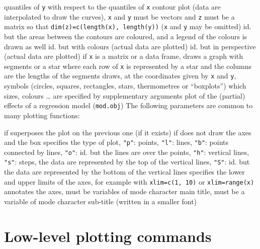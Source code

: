 	{quantiles of {\tt y} with respect to the quantiles of {\tt x}}
	{contour plot (data are interpolated to draw the curves), {\tt x} and {\tt y} must be vectors and {\tt z} must be a matrix so that {\tt dim(z)=c(length(x), length(y))} ({\tt x} and {\tt y} may be omitted)}
	{ id. but the areas between the contours are coloured, and a legend of the colours is drawn as well}
	{ id. but with colours (actual data are plotted)}
	{ id. but in perspective (actual data are plotted)}
	{if {\tt x} is a matrix or a data frame, draws a graph with segments or a star where each row of {\tt x} is represented by a star and the columns are the lengths of the segments}
	{draws, at the coordinates given by {\tt x} and {\tt y}, symbols (circles, squares, rectangles, stars, thermometres or ``boxplots'') which sizes, colours \ldots{} are specified by supplementary arguments}
	{ plot of the (partial) effects of a regression model ({\tt mod.obj})}
The following parameters are common to many plotting functions:

	{if \T superposes the plot on the previous one (if it exists)}
	{if \F does not draw the axes and the box}
	{ specifies the type of plot, {\tt "p"}: points, {\tt "l"}: lines, {\tt "b"}: points connected by lines, {\tt "o"}: id. but the lines are over the points, {\tt "h"}: vertical lines, {\tt "s"}: steps, the data are represented by the top of the vertical lines, {\tt "S"}: id. but the data are represented by the bottom of the vertical lines}
	{specifies the lower and upper limits of the axes, for example with {\tt xlim=c(1, 10)} or {\tt xlim=range(x)}}
	{ annotates the axes, must be variables of mode character}
	{ main title, must be a variable of mode character}
	{ sub-title (written in a smaller font)}
\section{Low-level plotting commands}{}

